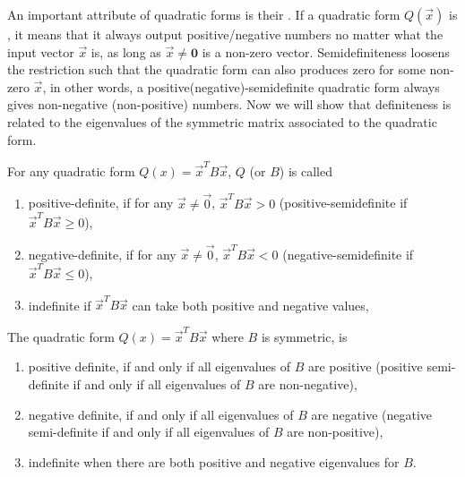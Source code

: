 An important attribute of quadratic forms is their . If a quadratic form $Q(\vec{x})$ is , it means that it always output positive/negative numbers no matter what the input vector $\vec{x}$ is, as long as $\vec{x} \neq \textbf{0}$ is a non-zero vector. Semidefiniteness loosens the restriction such that the quadratic form can also produces zero for some non-zero $\vec{x}$, in other words, a positive(negative)-semidefinite quadratic form always gives non-negative (non-positive) numbers. Now we will show that definiteness is related to the eigenvalues of the symmetric matrix associated to the quadratic form.
\begin{defn}
\label{defn:quaddefinite}
For any quadratic form $Q(x) = \vec{x}^T B\vec{x}$, $Q$ (or $B$) is called
\begin{enumerate}[label=(\alph*)]
\item positive-definite, if for any $\vec{x} \neq \vec{0}$, $\vec{x}^T B\vec{x} > 0$ (positive-semidefinite if $\vec{x}^T B\vec{x} \geq 0$), 
\item negative-definite, if for any $\vec{x} \neq \vec{0}$, $\vec{x}^T B\vec{x} < 0$ (negative-semidefinite if $\vec{x}^T B\vec{x} \leq 0$), 
\item indefinite if $\vec{x}^T B\vec{x}$ can take both positive and negative values,
\end{enumerate}
\end{defn}
\begin{thm}
\label{thm:quaddefinite}
The quadratic form $Q(x) = \vec{x}^T B\vec{x}$ where $B$ is symmetric, is
\begin{enumerate}[label=(\alph*)]
\item positive definite, if and only if all eigenvalues of $B$ are positive (positive semi-definite if and only if all eigenvalues of $B$ are non-negative), 
\item negative definite, if and only if all eigenvalues of $B$ are negative (negative semi-definite if and only if all eigenvalues of $B$ are non-positive), 
\item indefinite when there are both positive and negative eigenvalues for $B$.
\end{enumerate}
\end{thm}
